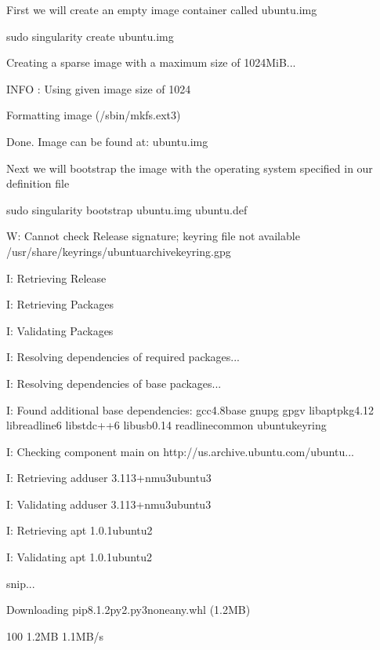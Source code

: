 \documentclass[letterpaper,10pt,english]{sphinxmanual}
\begin{document}
%
\begin{sphinxVerbatim}[commandchars=\\\{\}]
\PYGZsh{} First we will create an empty image container called ubuntu.img

\PYGZdl{} sudo singularity create ubuntu.img

Creating a sparse image with a maximum size of 1024MiB...

INFO   : Using given image size of 1024

Formatting image (/sbin/mkfs.ext3)

Done. Image can be found at: ubuntu.img


\PYGZsh{} Next we will bootstrap the image with the operating system specified in our definition file

\PYGZdl{} sudo singularity bootstrap ubuntu.img ubuntu.def

W: Cannot check Release signature; keyring file not available /usr/share/keyrings/ubuntu\PYGZhy{}archive\PYGZhy{}keyring.gpg

I: Retrieving Release

I: Retrieving Packages

I: Validating Packages

I: Resolving dependencies of required packages...

I: Resolving dependencies of base packages...

I: Found additional base dependencies: gcc\PYGZhy{}4.8\PYGZhy{}base gnupg gpgv libapt\PYGZhy{}pkg4.12 libreadline6 libstdc++6 libusb\PYGZhy{}0.1\PYGZhy{}4 readline\PYGZhy{}common ubuntu\PYGZhy{}keyring

I: Checking component main on http://us.archive.ubuntu.com/ubuntu...

I: Retrieving adduser 3.113+nmu3ubuntu3

I: Validating adduser 3.113+nmu3ubuntu3

I: Retrieving apt 1.0.1ubuntu2

I: Validating apt 1.0.1ubuntu2

snip...

Downloading pip\PYGZhy{}8.1.2\PYGZhy{}py2.py3\PYGZhy{}none\PYGZhy{}any.whl (1.2MB)

100\PYGZpc{} \textbar{}\PYGZsh{}\PYGZsh{}\PYGZsh{}\PYGZsh{}\PYGZsh{}\PYGZsh{}\PYGZsh{}\PYGZsh{}\PYGZsh{}\PYGZsh{}\PYGZsh{}\PYGZsh{}\PYGZsh{}\PYGZsh{}\PYGZsh{}\PYGZsh{}\PYGZsh{}\PYGZsh{}\PYGZsh{}\PYGZsh{}\PYGZsh{}\PYGZsh{}\PYGZsh{}\PYGZsh{}\PYGZsh{}\PYGZsh{}\PYGZsh{}\PYGZsh{}\PYGZsh{}\PYGZsh{}\PYGZsh{}\PYGZsh{}\textbar{} 1.2MB 1.1MB/s


\end{sphinxVerbatim}
\end{document}
